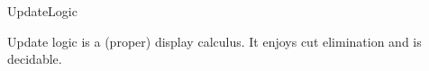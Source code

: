 \begin{entry}{UpdateLogic}

 \begin{technicalities}
Update logic  is a (proper) display calculus. It  enjoys  cut elimination and  is decidable. %
 \end{technicalities}

\end{entry}
